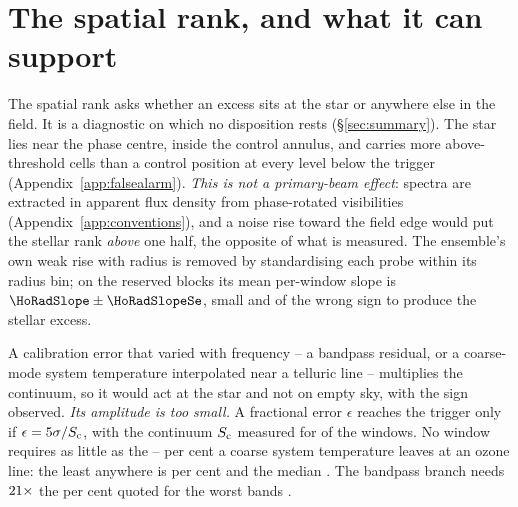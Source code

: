 \section{The spatial rank, and what it can support}
\label{app:radius}

The spatial rank asks whether an excess sits at the star or anywhere else in
the field. It is a diagnostic on which no disposition rests
(\S\ref{sec:summary}). The star lies near the phase centre, inside the control
annulus, and carries more above-threshold cells than a control position at
every level below the trigger (Appendix~\ref{app:falsealarm}). \emph{This is
not a primary-beam effect}: spectra are extracted in apparent flux density
from phase-rotated visibilities (Appendix~\ref{app:conventions}), and a noise
rise toward the field edge would put the stellar rank \emph{above} one half,
the opposite of what is measured. The ensemble's own weak rise with radius is
removed by standardising each probe within its radius bin; on the reserved
blocks its mean per-window slope is $\HoRadSlope\pm\HoRadSlopeSe$, small and of
the wrong sign to produce the stellar excess.

A calibration error that varied with frequency -- a bandpass residual, or a
coarse-mode system temperature interpolated near a telluric line
\citep{ALMATsys2018} -- multiplies the continuum, so it would act at the star
and not on empty sky, with the sign observed. \emph{Its amplitude is too
small.} A fractional error $\epsilon$ reaches the trigger only if
$\epsilon=5\sigma/S_{\rm c}$, with the continuum $S_{\rm c}$ measured for
\CyNWinMeas{} of the \CyNWinTot{} windows. No window requires as little as the
\CySpecTsysLo--\CySpecTsysHi{} per cent a coarse system temperature leaves at
an ozone line: the least anywhere is \CyEpsMinPct{} per cent and the median
\CyEpsMedPct. The bandpass branch needs $21\times$ the
\CdSpecBpWorst{} per cent quoted for the worst bands
\citep{ALMAKBBandpass,ALMATechNote15}.

